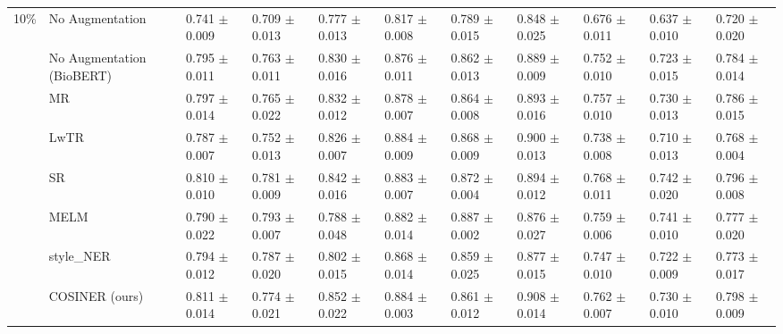 \documentclass{article}
\begin{document}
\begin{table}
{{\begin{tabular}{cllll|lll|lll}
\midrule
\multirow{8}{*}{10\%} & No Augmentation & 0.741 $\pm$ 0.009 & 0.709 $\pm$ 0.013 & 0.777 $\pm$ 0.013 & 0.817 $\pm$ 0.008 & 0.789 $\pm$ 0.015 & 0.848 $\pm$ 0.025 & 0.676 $\pm$ 0.011 & 0.637 $\pm$ 0.010 & 0.720 $\pm$ 0.020 \\
&No Augmentation (BioBERT) & 0.795 $\pm$ 0.011 & 0.763 $\pm$ 0.011 & 0.830 $\pm$ 0.016 & 0.876 $\pm$ 0.011 & 0.862 $\pm$ 0.013 & 0.889 $\pm$ 0.009 & 0.752 $\pm$ 0.010 & 0.723 $\pm$ 0.015 & 0.784 $\pm$ 0.014 \\
&MR & 0.797 $\pm$ 0.014 & 0.765 $\pm$ 0.022 & 0.832 $\pm$ 0.012 & 0.878 $\pm$ 0.007 & 0.864 $\pm$ 0.008 & 0.893 $\pm$ 0.016 & 0.757 $\pm$ 0.010 & 0.730 $\pm$ 0.013 & 0.786 $\pm$ 0.015 \\
&LwTR & 0.787 $\pm$ 0.007 & 0.752 $\pm$ 0.013 & 0.826 $\pm$ 0.007 & 0.884 $\pm$ 0.009 & 0.868 $\pm$ 0.009 & 0.900 $\pm$ 0.013 & 0.738 $\pm$ 0.008 & 0.710 $\pm$ 0.013 & 0.768 $\pm$ 0.004 \\
&SR & 0.810 $\pm$ 0.010 & 0.781 $\pm$ 0.009 & 0.842 $\pm$ 0.016 & 0.883 $\pm$ 0.007 & 0.872 $\pm$ 0.004 & 0.894 $\pm$ 0.012 & 0.768 $\pm$ 0.011 & 0.742 $\pm$ 0.020 & 0.796 $\pm$ 0.008 \\
&MELM & 0.790 $\pm$ 0.022 & 0.793 $\pm$ 0.007 & 0.788 $\pm$ 0.048 & 0.882 $\pm$ 0.014 & 0.887 $\pm$ 0.002 & 0.876 $\pm$ 0.027 & 0.759 $\pm$ 0.006 & 0.741 $\pm$ 0.010 & 0.777 $\pm$ 0.020 \\
&style\_NER & 0.794 $\pm$ 0.012 & 0.787 $\pm$ 0.020 & 0.802 $\pm$ 0.015 & 0.868 $\pm$ 0.014 & 0.859 $\pm$ 0.025 & 0.877 $\pm$ 0.015 & 0.747 $\pm$ 0.010 & 0.722 $\pm$ 0.009 & 0.773 $\pm$ 0.017 \\
&COSINER (ours) & 0.811 $\pm$ 0.014 & 0.774 $\pm$ 0.021 & 0.852 $\pm$ 0.022 & 0.884 $\pm$ 0.003 & 0.861 $\pm$ 0.012 & 0.908 $\pm$ 0.014 & 0.762 $\pm$ 0.007 & 0.730 $\pm$ 0.010 & 0.798 $\pm$ 0.009 \\\bottomrule
        \end{tabular}}}
        \label{tab:baselines_comp}
        \end{table}
\end{document}
